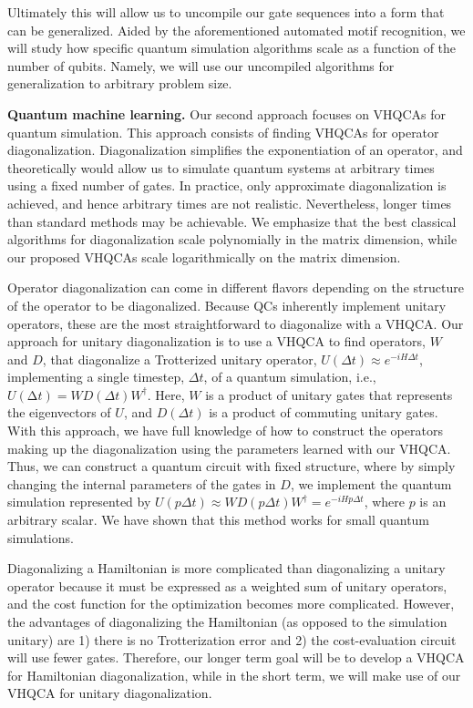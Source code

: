 \documentclass[10pt]{article}
\begin{document}
Ultimately this will allow us to uncompile our gate sequences into a form that can be generalized. Aided by the aforementioned automated motif recognition, we will study how specific quantum simulation algorithms scale as a function of the number of qubits. Namely, we will use our uncompiled algorithms for generalization to arbitrary problem size. 


\textbf{Quantum machine learning.} Our second approach focuses on VHQCAs for quantum simulation. This approach consists of finding VHQCAs for operator diagonalization. Diagonalization simplifies the exponentiation of an operator, and theoretically would allow us to simulate quantum systems at arbitrary times using a fixed number of gates. In practice, only approximate diagonalization is achieved, and hence arbitrary times are not realistic. Nevertheless, longer times than standard methods may be achievable. We emphasize that the best classical algorithms for diagonalization scale polynomially in the matrix dimension, while our proposed VHQCAs scale logarithmically on the matrix dimension. 

Operator diagonalization can come in different flavors depending on the structure of the operator to be diagonalized. Because QCs inherently implement unitary operators, these are the most straightforward to diagonalize with a VHQCA. Our approach for unitary diagonalization is to use a VHQCA to find operators, $W$ and $D$, that diagonalize a Trotterized unitary operator, $U(\Delta t) \approx  e^{-iH\Delta t}$, implementing a single timestep, $\Delta t$, of a quantum simulation, i.e., $U(∆t)=WD(\Delta t)W^\dagger$. Here, $W$ is a product of unitary gates that represents the eigenvectors of $U$, and $D(\Delta t)$ is a product of commuting unitary gates. With this approach, we have full knowledge of how to construct the operators making up the diagonalization using the parameters learned with our VHQCA. Thus, we can construct a quantum circuit with fixed structure, where by simply changing the internal parameters of the gates in $D$, we implement the quantum simulation represented by $U(p\Delta t) \approx WD(p\Delta t)W^\dagger = e^{-iH p \Delta t}$, where $p$ is an arbitrary scalar. We have shown that this method works for small quantum simulations.

Diagonalizing a Hamiltonian is more complicated than diagonalizing a unitary operator because it must be expressed as a weighted sum of unitary operators, and the cost function for the optimization becomes more complicated. However, the advantages of diagonalizing the Hamiltonian (as opposed to the simulation unitary) are 1) there is no Trotterization error and 2) the cost-evaluation circuit will use fewer gates. Therefore, our longer term goal will be to develop a VHQCA for Hamiltonian diagonalization, while in the short term, we will make use of our VHQCA for unitary diagonalization.
\end{document}
